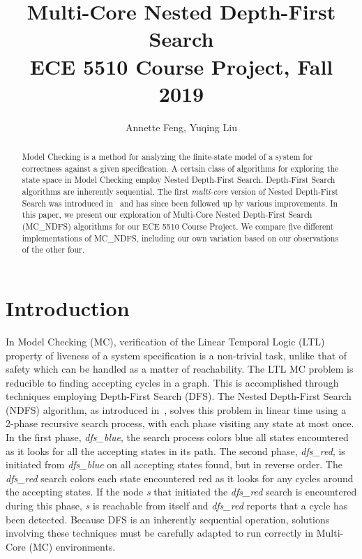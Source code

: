 \documentclass[a4paper]{article}
\title{%
    Multi-Core Nested Depth-First Search\\
    \large ECE 5510 Course Project, Fall 2019}
\author{Annette Feng, Yuqing Liu}
\begin{document}
\maketitle


\begin{abstract}

Model Checking is a method for analyzing the finite-state model of a system for correctness against a given specification. A certain class of algorithms for exploring the state space in Model Checking employ Nested Depth-First Search. Depth-First Search algorithms are inherently sequential. The first \emph{multi-core} version of Nested Depth-First Search was introduced in~\cite{laarman} and has since been followed up by various improvements. In this paper, we present our exploration of Multi-Core Nested Depth-First Search (MC\_NDFS) algorithms for our ECE 5510 Course Project. We compare five different implementations of MC\_NDFS, including our own variation based on our observations of the other four.

\end{abstract}


\section{Introduction}

In Model Checking (MC), verification of the Linear Temporal Logic (LTL) property of liveness of a system specification is a non-trivial task, unlike that of safety which can be handled as a matter of reachability. The LTL MC problem is reducible to finding accepting cycles in a graph. This is accomplished through techniques employing Depth-First Search (DFS). The Nested Depth-First Search (NDFS) algorithm, as introduced in~\cite{ndfs}, solves this problem in linear time using a 2-phase recursive search process, with each phase visiting any state at most once. In the first phase, \emph{dfs\_blue}, the search process colors blue all states encountered as it looks for all the accepting states in its path. The second phase, \emph{dfs\_red}, is initiated from \emph{dfs\_blue} on all accepting states found, but in reverse order. The \emph{dfs\_red} search colors each state encountered red as it looks for any cycles around the accepting states. If the node \emph{s} that initiated the \emph{dfs\_red} search is encountered during this phase, \emph{s} is reachable from itself and \emph{dfs\_red} reports that a cycle has been detected. Because DFS is an inherently sequential operation, solutions involving these techniques must be carefully adapted to run correctly in Multi-Core (MC) environments.
\end{document}
